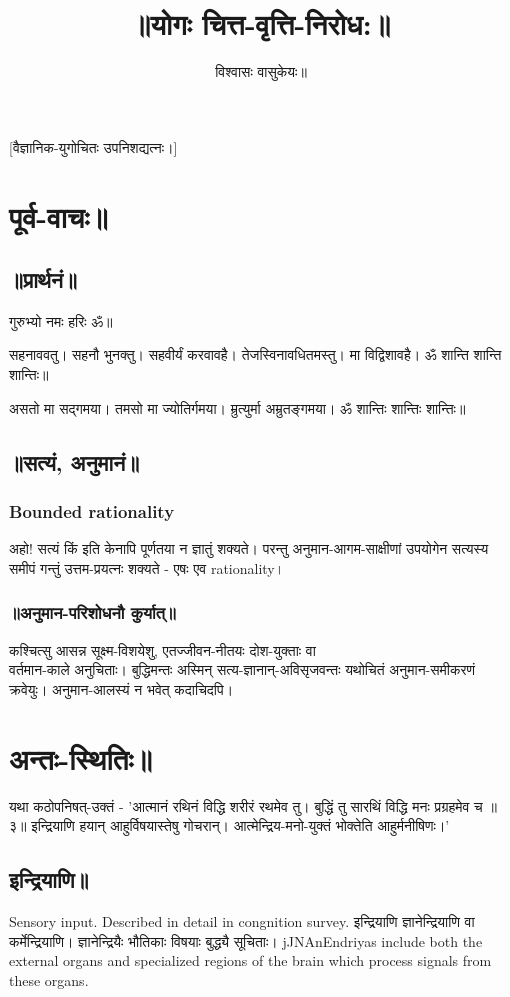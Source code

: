 \documentclass[oneside, article]{memoir}
\title{॥योगः चित्त-वृत्ति-निरोध:॥}
\author{विश्वासः वासुकेयः॥}
\begin{document}
\maketitle

[वैज्ञानिक-युगोचितः उपनिशद्यत्नः।]

\tableofcontents

\part{पूर्व-वाचः॥}
\chapter{॥प्रार्थनं॥}
गुरुभ्यो नमः हरिः ॐ॥

सहनाववतु। सहनौ भुनक्तु। सहवीर्यं करवावहै। तेजस्विनावधितमस्तु। मा विद्विशावहै। ॐ शान्ति शान्ति शान्तिः॥

असतो मा सद्गमया। तमसो मा ज्योतिर्गमया। म्रुत्युर्मा अम्रुतङ्गमया। ॐ शान्तिः शान्तिः शान्तिः॥

\chapter{॥सत्यं, अनुमानं॥}
\section{Bounded rationality}
अहो! सत्यं किं इति केनापि पूर्णतया न ज्ञातुं शक्यते। परन्तु अनुमान-आगम-साक्षीणां उपयोगेन सत्यस्य समीपं गन्तुं उत्तम-प्रयत्नः शक्यते - एषः एव rationality।

\section{॥अनुमान-परिशोधनौ कुर्यात्॥}
कश्चित्सु आसन्न सूक्ष्म-विशयेशु, एतज्जीवन-नीतयः दोश-युक्ताः वा \\
वर्तमान-काले अनुचिताः। बुद्धिमन्तः अस्मिन् सत्य-ज्ञानान्-अविसृजवन्तः यथोचितं अनुमान-समीकरणं क्रवेयुः। अनुमान-आलस्यं न भवेत् कदाचिदपि।

\part{अन्तः-स्थितिः॥}
यथा कठोपनिषत्-उक्तं - 'आत्मानं रथिनं विद्धि शरीरं रथमेव तु। बुद्धिं तु सारथिं विद्धि मनः प्रग्रहमेव च ॥३॥ इन्द्रियाणि हयान् आहुर्विषयास्तेषु गोचरान्। आत्मेन्द्रिय-मनो-युक्तं भोक्तेति आहुर्मनीषिणः।'

\chapter{इन्द्रियाणि॥}
Sensory input. Described in detail in congnition survey.
इन्द्रियाणि ज्ञानेन्द्रियाणि वा कर्मेन्द्रियाणि। ज्ञानेन्द्रियैः भौतिकाः विषयाः बुद्ध्यै सूचिताः। jJNAnEndriyas include both the external organs and specialized regions of the brain which process signals from these organs.
\end{document}
